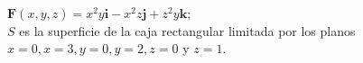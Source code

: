 \item $\mathbf{F}(x, y, z) = x^2y\mathbf{i} - x^2z\mathbf{j} + z^2y\mathbf{k}$;\\
    $S$ es la superficie de la caja rectangular limitada por los planos $x = 0, x = 3, y = 0, y = 2, z = 0$ y $z = 1$.
